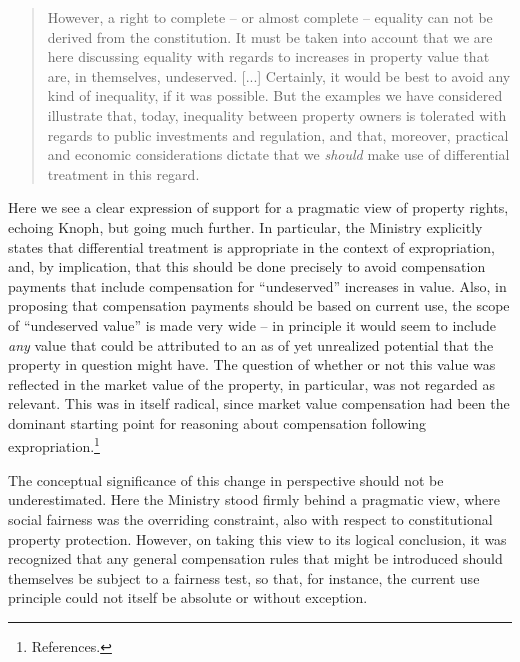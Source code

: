 \begin{quote}
However, a right to complete -- or almost complete -- equality can not be derived from the constitution. It must be taken into account that we are here discussing equality with regards to increases in property value that are, in themselves, undeserved. [...]  %
Certainly, it would be best to avoid any kind of inequality, if it was possible. But the examples we have considered illustrate that, today, inequality between property owners is tolerated with regards to public investments and regulation, and that, moreover, practical and economic considerations dictate that we \emph{should} make use of differential treatment in this regard.
\end{quote}

Here we see a clear expression of support for a pragmatic view of property rights, echoing Knoph, but going much further. In particular, the Ministry explicitly states that differential treatment is appropriate in the context of expropriation, and, by implication, that this should be done precisely to avoid compensation payments that include compensation for ``undeserved'' increases in value. Also, in proposing that compensation payments should be based on current use, the scope of ``undeserved value'' is made very wide -- in principle it would seem to include \emph{any} value that could be attributed to an as of yet unrealized potential that the property in question might have. The question of whether or not this value was reflected in the market value of the property, in particular, was not regarded as relevant. This was in itself radical, since market value compensation had been the dominant starting point for reasoning about compensation following expropriation.\footnote{References.}

The conceptual significance of this change in perspective should not be underestimated. Here the Ministry stood firmly behind a pragmatic view, where social fairness was the overriding constraint, also with respect to constitutional property protection. However, on taking this view to its logical conclusion, it was recognized that any general compensation rules that might be introduced should themselves be subject to a fairness test, so that, for instance, the current use principle could not itself be absolute or without exception. 

